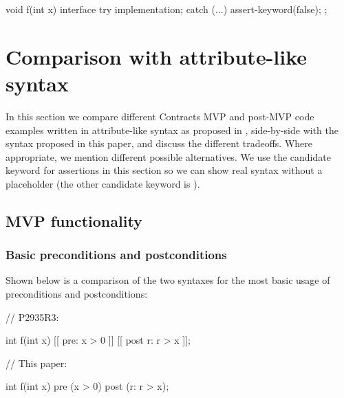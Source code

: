 \begin{codeblock}
void f(int x)
interface {
  try {
    implementation;
  } 
  catch (...) {
    assert-keyword(false);
  }
};
\end{codeblock}


\section{Comparison with attribute-like syntax}

In this section we compare different Contracts MVP and post-MVP code examples written in attribute-like syntax as proposed in \cite{P2935R3}, side-by-side with the syntax proposed in this paper, and discuss the different tradeoffs. Where appropriate, we mention different possible alternatives. We use the candidate keyword  for assertions in this section so we can show real syntax without a placeholder (the other candidate keyword is \mbox{}).

\subsection{MVP functionality}

\subsubsection{Basic preconditions and postconditions}
Shown below is a comparison of the two syntaxes for the most basic usage of preconditions and postconditions:

\begin{minipage}{8cm}
\begin{codeblock}
// P2935R3:

int f(int x) 
  [[ pre: x > 0 ]]
  [[ post r: r > x ]];
\end{codeblock}
\end{minipage}
\begin{minipage}{8cm}
\begin{codeblock}
// This paper:

int f(int x) 
  pre (x > 0)
  post (r: r > x);
\end{codeblock}
\end{minipage}

